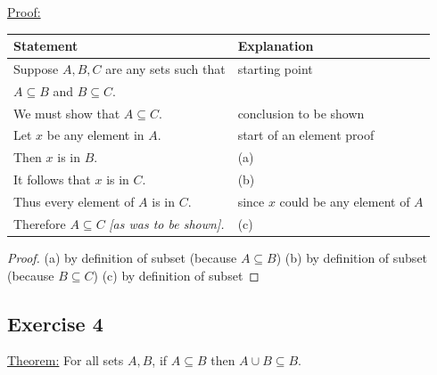 \documentclass[14pt]{extarticle}
\newcommand{\fbl}{\underline{\hspace{1cm}}\,\,}
\newcommand{\cy}{\color{cyan}}
\begin{document}
\underline{Proof:}
\begin{center}
\begin{tabular}{|l|l|}
\hline
{\bf Statement} & {\bf Explanation} \\ 
\hline
Suppose $A, B, C$ are any sets such that & starting point \\
\(A \subseteq B\) and \(B \subseteq C\). & \\
\hline
We must show that \(A \subseteq C\). & conclusion to be shown \\
\hline
Let $x$ be any element in $A$. & start of an element proof \\
\hline
Then $x$ is in $B$. & {\cy (a)} \fbl \\
\hline
It follows that $x$ is in $C$. & {\cy (b)} \fbl \\
\hline
Thus every element of $A$ is in $C$. & since $x$ could be any element of $A$ \\
\hline
Therefore \(A \subseteq C\) {\it [as was to be shown].} & {\cy (c)} \fbl \\
\hline
\end{tabular}
\end{center}

\begin{proof}
(a) by definition of subset (because $A \subseteq B$) (b) by definition of subset (because $B \subseteq C$) 
(c) by definition of subset
\end{proof}

\subsection{Exercise 4}
\underline{Theorem:} For all sets $A, B$, if \(A \subseteq B\) then \(A \cup B \subseteq B\).
\end{document}
